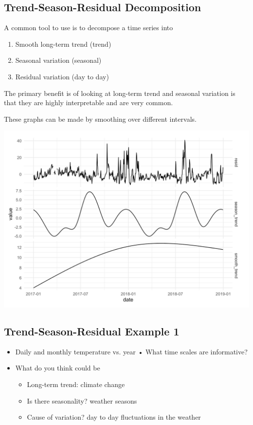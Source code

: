\documentclass[11pt]{article}
\theoremstyle{definition}
\begin{document}
\subsection{Trend-Season-Residual Decomposition}
A common tool to use is to
decompose a time series into

\begin{enumerate}
  \item Smooth long-term trend (trend)
  \item Seasonal variation (seasonal)
  \item Residual variation (day to day)
\end{enumerate}

The primary benefit is of
looking at long-term trend
and seasonal variation is that
they are highly interpretable
and are very common.

These graphs can be made by smoothing over different intervals.

\includegraphics[width=\textwidth]{2.png}

\subsection{Trend-Season-Residual Example 1}
\begin{itemize}
  \item Daily and monthly
  temperature vs. year
  • What time scales are
  informative?
  \item What do you think
  could be
  \begin{itemize}
    \item Long-term trend: climate change
    \item Is there seasonality? weather seasons
    \item Cause of variation? day to day fluctuations in the weather
  \end{itemize}
\end{itemize}
\end{document}
